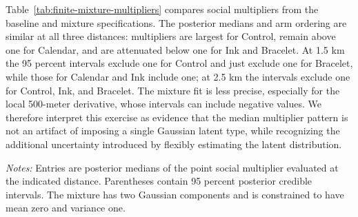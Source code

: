 \documentclass[12pt]{article}
\begin{document}
Table~\ref{tab:finite-mixture-multipliers} compares social multipliers from
the baseline and mixture specifications. The posterior medians and arm
ordering are similar at all three distances: multipliers are largest for
Control, remain above one for Calendar, and are attenuated below one for Ink
and Bracelet. At 1.5 km the 95 percent intervals exclude one for Control and
just exclude one for Bracelet, while those for Calendar and Ink include one;
at 2.5 km the intervals exclude one for Control, Ink, and Bracelet. The
mixture fit is less precise, especially for the local 500-meter derivative,
whose intervals can include negative values. We therefore interpret this
exercise as evidence that the median multiplier pattern is not an artifact of
imposing a single Gaussian latent type, while recognizing the additional
uncertainty introduced by flexibly estimating the latent distribution.

\begin{table}[htbp]
  \centering
  \small
  \caption{Social multipliers under Gaussian and finite-mixture intrinsic motivation}
  \label{tab:finite-mixture-multipliers}
  \begin{threeparttable}
    
    \begin{tablenotes}\footnotesize
      \item \textit{Notes:} Entries are posterior medians of the point social
      multiplier evaluated at the indicated distance. Parentheses contain 95
      percent posterior credible intervals. The mixture has two Gaussian
      components and is constrained to have mean zero and variance one.
    \end{tablenotes}
  \end{threeparttable}
\end{table}

\clearpage
\end{document}
